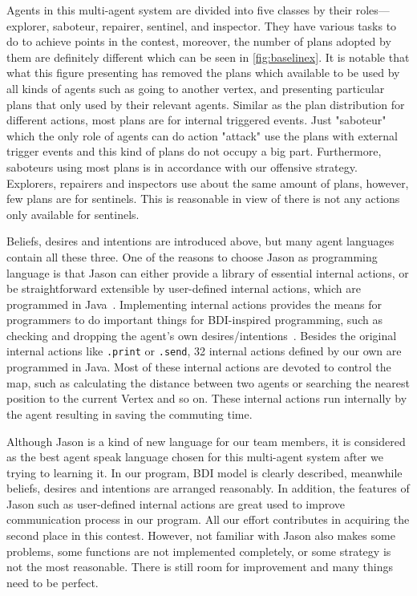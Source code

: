 Agents in this multi-agent system are divided into five classes by their roles---explorer, saboteur, repairer, sentinel, and inspector. They have various tasks to do to achieve points in the contest, moreover, the number of plans adopted by them are definitely different which can be seen in \autoref{fig:baselinex}.
It is notable that what this figure presenting has removed the plans which available to be used by all kinds of agents such as going to another vertex, and presenting particular plans that only used by their relevant agents.
Similar as the plan distribution for different actions, most plans are for internal triggered events. Just "saboteur" which the only role of agents can do action "attack" use the plans with external trigger events and this kind of plans do not occupy a big part. Furthermore, saboteurs using most plans is in accordance with our offensive strategy. Explorers, repairers and inspectors use about the same amount of plans, however, few plans are for sentinels. This is reasonable in view of there is not any actions only available for sentinels.

Beliefs, desires and intentions are introduced above, but many agent languages contain all these three. One of the reasons to choose Jason as programming language is that Jason can either provide a library of essential internal actions, or be straightforward extensible by user-defined internal actions, which are programmed in Java~\cite{rafael_Javabased_2007}. Implementing internal actions provides the means for programmers to do important things for BDI-inspired programming, such as checking and dropping the agent's own
desires/intentions~\cite{rafael_overviewjason_2006}. Besides the original internal actions like \texttt{.print} or \texttt{.send}, 32 internal actions defined by our own are programmed in Java. Most of these internal actions are devoted to control the map, such as calculating the distance between two agents or searching the nearest position to the current Vertex and so on. These internal actions run internally by the agent resulting in saving the commuting time.

Although Jason is a kind of new language for our team members, it is considered as the best agent speak language chosen for this multi-agent system after we trying to learning it. In our program, BDI model is clearly described, meanwhile beliefs, desires and intentions are arranged reasonably. In addition, the features of Jason such as user-defined internal actions are great used to improve communication process in our program. All our effort contributes in acquiring the second place in this contest. However, not familiar with Jason also makes some problems, some functions are not implemented completely, or some strategy is not the most reasonable. There is still room for improvement and many things need to be perfect.
